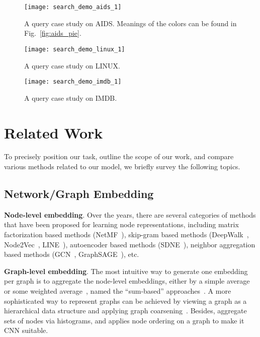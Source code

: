 \documentclass[sigconf]{acmart}
\begin{document}
\begin{figure}
    \centering
    {{\texttt{[image: search\_demo\_aids\_1]} }}
    \vspace{-0.1in}
    \caption{A query case study on AIDS. Meanings of the colors can be found in Fig.~\ref{fig:aids_pie}. }
    \vspace{-0.1in}
    \label{fig:search_demo_aids}
\end{figure}

\begin{figure}
    \centering
    {{\texttt{[image: search\_demo\_linux\_1]} }}
\vspace{-0.1in}
    \caption{A query case study on LINUX.}
    \vspace{-0.1in}
    \label{fig:search_demo_linux}
\end{figure}

\begin{figure}
    \centering
    {{\texttt{[image: search\_demo\_imdb\_1]} }}
\vspace{-0.1in}
    \caption{A query case study on IMDB.}
    \vspace{-0.1in}
    \label{fig:search_demo_imdb}
\end{figure}

 \section{Related Work}
\label{sec-related}

To precisely position our task, outline the scope of our work, and compare various methods related to our model, we briefly survey the following topics.
\subsection{Network/Graph Embedding}
\textbf{Node-level embedding}. Over the years, there are several categories of methods that have been proposed for learning node representations, including matrix factorization based methods (NetMF~\cite{qiu2018network}), skip-gram based methods (DeepWalk~\cite{perozzi2014deepwalk}, Node2Vec~\cite{grover2016node2vec}, LINE~\cite{tang2015line}), autoencoder based methods (SDNE~\cite{wang2016structural}), neighbor aggregation based methods (GCN~\cite{defferrard2016convolutional,kipf2016semi,kipf2016variational}, GraphSAGE~\cite{hamilton2017inductive}), etc. 

\noindent\textbf{Graph-level embedding}. The most intuitive way to generate one embedding per graph is to aggregate the node-level embeddings, either by a simple average or some weighted average~\cite{duvenaud2015convolutional,dai2016discriminative,zhao2018substructure}, named the ``sum-based'' approaches~\cite{hamilton2017representation}.  A more sophisticated way to represent graphs can be achieved by viewing a graph as a hierarchical data structure and applying graph coarsening~\cite{bruna2013spectral,defferrard2016convolutional,simonovsky2017dynamic,ying2018hierarchical}. Besides, \cite{kearnes2016molecular} aggregate sets of nodes via histograms, and \cite{niepert2016learning} applies node ordering on a graph to make it CNN suitable.
\end{document}
